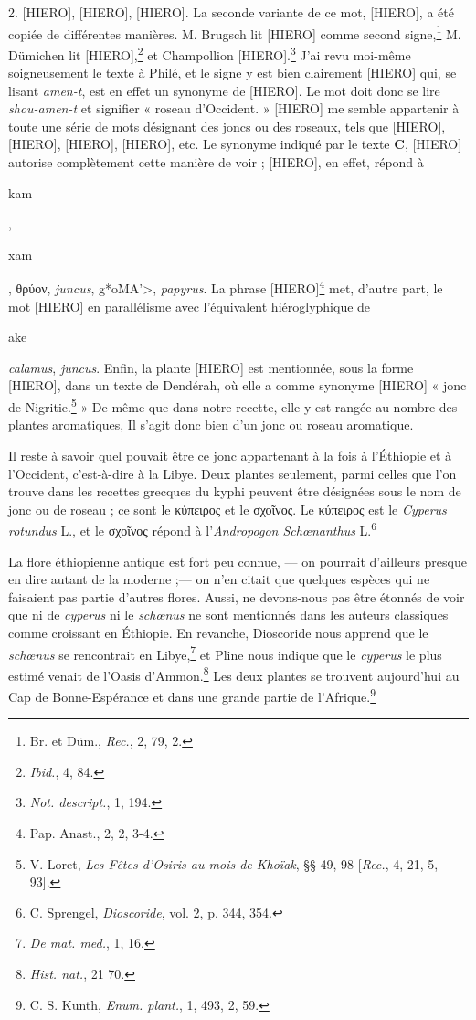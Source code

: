 \documentclass[a4paper, 11pt, oneside, landscape]{article}
\begin{document}
2. [HIERO], [HIERO], [HIERO]. La seconde variante de ce mot, [HIERO], a été copiée de différentes manières. M. Brugsch lit [HIERO] comme second signe,\footnote{Br. et Düm., \emph{Rec.}, 2, 79, 2.} M. Dümichen lit [HIERO],\footnote{\emph{Ibid.}, 4, 84.} et Champollion [HIERO].\footnote{\emph{Not. descript.}, 1, 194.} J'ai revu moi-même soigneusement le texte à Philé, et le signe y est bien clairement [HIERO] qui, se lisant \emph{amen-t}, est en effet un synonyme de [HIERO]. Le mot doit donc se lire \emph{shou-amen-t} et signifier « roseau d'Occident. » [HIERO] me semble appartenir à toute une série de mots désignant des joncs ou des roseaux, tels que [HIERO], [HIERO], [HIERO], [HIERO], etc. Le synonyme indiqué par le texte \textbf{C}, [HIERO] autorise complètement cette manière de voir ; [HIERO], en effet, répond à \begin{coptic}kam\end{coptic}, \begin{coptic}xam\end{coptic}, θρύον, \emph{juncus}, \foreignlanguage{hebrew}{\<g*oMA'>}, \emph{papyrus}. La phrase [HIERO]\footnote{Pap. Anast., 2, 2, 3-4.} met, d'autre part, le mot [HIERO] en parallélisme avec l'équivalent hiéroglyphique de \begin{coptic}ake\end{coptic} \emph{calamus}, \emph{juncus}. Enfin, la plante [HIERO] est mentionnée, sous la forme [HIERO], dans un texte de Dendérah, où elle a comme synonyme [HIERO] « jonc de Nigritie.\footnote{V. Loret, \emph{Les Fêtes d'Osiris au mois de Khoïak}, §§ 49, 98 [\emph{Rec.}, 4, 21, 5, 93].} » De même que dans notre recette, elle y est rangée au nombre des plantes aromatiques, Il s'agit donc bien d'un jonc ou roseau aromatique.

Il reste à savoir quel pouvait être ce jonc appartenant à la fois à l'Éthiopie et à l'Occident, c'est-à-dire à la Libye. Deux plantes seulement, parmi celles que l'on trouve dans les recettes grecques du kyphi peuvent être désignées sous le nom de jonc ou de roseau ; ce sont le κύπειρος et le σχοῖνος. Le κύπειρος est le \emph{Cyperus rotundus} L., et le σχοῖνος répond à l'\emph{Andropogon Schœnanthus} L.\footnote{C. Sprengel, \emph{Dioscoride}, vol. 2, p. 344, 354.}

La flore éthiopienne antique est fort peu connue, --- on pourrait d'ailleurs presque en dire autant de la moderne ;--- on n'en citait que quelques espèces qui ne faisaient pas partie d'autres flores. Aussi, ne devons-nous pas être étonnés de voir que ni de \emph{cyperus} ni le \emph{schœnus} ne sont mentionnés dans les auteurs classiques comme croissant en Éthiopie. En revanche, Dioscoride nous apprend que le \emph{schœnus} se rencontrait en Libye,\footnote{\emph{De mat. med.}, 1, 16.} et Pline nous indique que le \emph{cyperus} le plus estimé venait de l'Oasis d'Ammon.\footnote{\emph{Hist. nat.}, 21 70.} Les deux plantes se trouvent aujourd'hui au Cap de Bonne-Espérance et dans une grande partie de l'Afrique.\footnote{C. S. Kunth, \emph{Enum. plant.}, 1, 493, 2, 59.}
\end{document}
